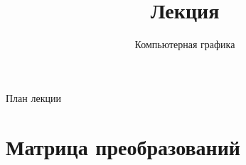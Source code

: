 \documentclass[10pt]{beamer}
\title{Лекция \lecdni \\ \lecturename}
\subtitle{Компьютерная графика}
\begin{document}
 		 



    
    \QRFRAME
	
	
	\frame{\maketitle}
	
	
	
	\begin{frame}{План лекции}
		\tableofcontents
	\end{frame}
	
	
	
	\section{Матрица преобразований}
	
	\frame{\sectionpage}
	
\end{document}

